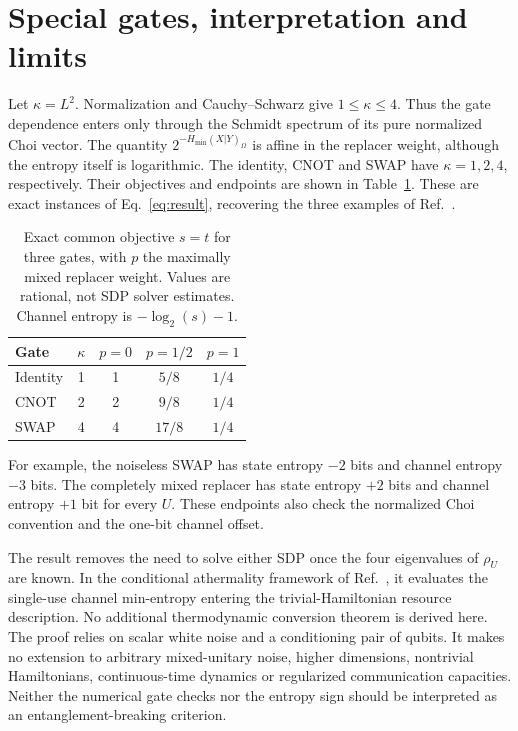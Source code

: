 \documentclass[11pt]{article}
\begin{document}
\section{Special gates, interpretation and limits}
Let $\kappa=L^2$. Normalization and Cauchy--Schwarz give
$1\leq\kappa\leq4$. Thus the gate dependence enters only through
the Schmidt spectrum of its pure normalized Choi vector.
The quantity $2^{-H_{\min}(X|Y)_\Omega}$ is affine in the replacer
weight, although the entropy itself is logarithmic.
The identity, CNOT and SWAP have $\kappa=1,2,4$, respectively.
Their objectives and endpoints are shown in Table~\ref{tab:gates}.
These are exact instances of Eq.~\eqref{eq:result}, recovering the
three examples of Ref.~\cite{Badhani2026}.

\begin{table}[ht]
\centering
\caption{Exact common objective $s=t$ for three gates, with $p$
the maximally mixed replacer weight. Values are rational, not SDP
solver estimates. Channel entropy is $-\log_2(s)-1$.}
\label{tab:gates}
\begin{tabular}{lcccc}
\toprule
Gate & $\kappa$ & $p=0$ & $p=1/2$ & $p=1$\\
\midrule
Identity & 1 & 1 & $5/8$ & $1/4$\\
CNOT     & 2 & 2 & $9/8$ & $1/4$\\
SWAP     & 4 & 4 & $17/8$ & $1/4$\\
\bottomrule
\end{tabular}
\end{table}

For example, the noiseless SWAP has state entropy $-2$ bits and
channel entropy $-3$ bits. The completely mixed replacer has
state entropy $+2$ bits and channel entropy $+1$ bit for every $U$.
These endpoints also check the normalized Choi convention and
the one-bit channel offset.

The result removes the need to solve either SDP once the four
eigenvalues of $\rho_U$ are known. In the conditional athermality
framework of Ref.~\cite{Badhani2026}, it evaluates the single-use
channel min-entropy entering the trivial-Hamiltonian resource
description. No additional thermodynamic conversion theorem is
derived here. The proof relies on scalar white noise and a
conditioning pair of qubits. It makes no extension to arbitrary
mixed-unitary noise, higher dimensions, nontrivial Hamiltonians,
continuous-time dynamics or regularized communication capacities.
Neither the numerical gate checks nor the entropy sign should be
interpreted as an entanglement-breaking criterion.
\end{document}
